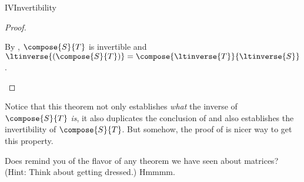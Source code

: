 \begin{subsect}{IV}{Invertibility}
\begin{proof}
%
\begin{para}By , $\compose{S}{T}$ is invertible and $\ltinverse{\left(\compose{S}{T}\right)}=\compose{\ltinverse{T}}{\ltinverse{S}}$.\end{para}
%
\end{proof}
%
\begin{para}Notice that this theorem not only establishes {\em what} the inverse of $\compose{S}{T}$ {\em is}, it also duplicates the conclusion of  and also establishes the invertibility of $\compose{S}{T}$.  But somehow, the proof of  is nicer way to get this property.\end{para}
%
\begin{para}Does  remind you of the flavor of any theorem we have seen about matrices?  (Hint:  Think about getting dressed.)  Hmmmm.\end{para}
%
%
\end{subsect}
%
